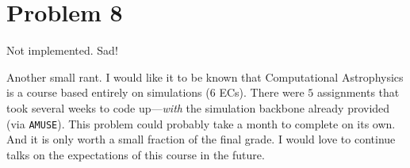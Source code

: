 \section{Problem 8}
Not implemented. Sad!

Another small rant. I would like it to be known that Computational Astrophysics
is a course based entirely on simulations ($6$ ECs). There were $5$ assignments
that took several weeks to code up---\emph{with} the simulation backbone
already provided (via \texttt{AMUSE}). This problem could probably take a
month to complete on its own. And it is only worth a small fraction of the
final grade. I would love to continue talks on the expectations of this course
in the future.
